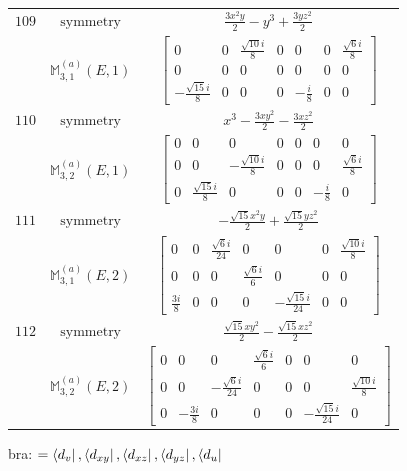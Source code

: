 \documentclass[fleqn,8pt,landscape]{jsarticle}
\begin{document}
\begin{longtable}{ccc}
$ 109 $ & $ \text{symmetry} $ & $ \frac{3 x^{2} y}{2} - y^{3} + \frac{3 y z^{2}}{2} $ \\
$  $ & $ \mathbb{M}_{3,1}^{(a)}(E,1) $ & $ \begin{bmatrix} 0 & 0 & \frac{\sqrt{10} i}{8} & 0 & 0 & 0 & \frac{\sqrt{6} i}{8} \\ 0 & 0 & 0 & 0 & 0 & 0 & 0 \\ - \frac{\sqrt{15} i}{8} & 0 & 0 & 0 & - \frac{i}{8} & 0 & 0 \end{bmatrix} $ \\ \hline
$ 110 $ & $ \text{symmetry} $ & $ x^{3} - \frac{3 x y^{2}}{2} - \frac{3 x z^{2}}{2} $ \\
$  $ & $ \mathbb{M}_{3,2}^{(a)}(E,1) $ & $ \begin{bmatrix} 0 & 0 & 0 & 0 & 0 & 0 & 0 \\ 0 & 0 & - \frac{\sqrt{10} i}{8} & 0 & 0 & 0 & \frac{\sqrt{6} i}{8} \\ 0 & \frac{\sqrt{15} i}{8} & 0 & 0 & 0 & - \frac{i}{8} & 0 \end{bmatrix} $ \\ \hline
$ 111 $ & $ \text{symmetry} $ & $ - \frac{\sqrt{15} x^{2} y}{2} + \frac{\sqrt{15} y z^{2}}{2} $ \\
$  $ & $ \mathbb{M}_{3,1}^{(a)}(E,2) $ & $ \begin{bmatrix} 0 & 0 & \frac{\sqrt{6} i}{24} & 0 & 0 & 0 & \frac{\sqrt{10} i}{8} \\ 0 & 0 & 0 & \frac{\sqrt{6} i}{6} & 0 & 0 & 0 \\ \frac{3 i}{8} & 0 & 0 & 0 & - \frac{\sqrt{15} i}{24} & 0 & 0 \end{bmatrix} $ \\ \hline
$ 112 $ & $ \text{symmetry} $ & $ \frac{\sqrt{15} x y^{2}}{2} - \frac{\sqrt{15} x z^{2}}{2} $ \\
$  $ & $ \mathbb{M}_{3,2}^{(a)}(E,2) $ & $ \begin{bmatrix} 0 & 0 & 0 & \frac{\sqrt{6} i}{6} & 0 & 0 & 0 \\ 0 & 0 & - \frac{\sqrt{6} i}{24} & 0 & 0 & 0 & \frac{\sqrt{10} i}{8} \\ 0 & - \frac{3 i}{8} & 0 & 0 & 0 & - \frac{\sqrt{15} i}{24} & 0 \end{bmatrix} $ \\ \hline
\end{longtable}
bra: $=\bra{d_{v}}, \bra{d_{xy}}, \bra{d_{xz}}, \bra{d_{yz}}, \bra{d_{u}}$
\end{document}
